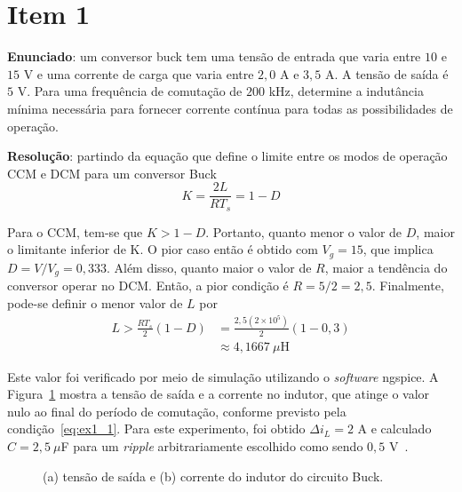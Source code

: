\section*{Item 1}\label{it:1}

\textbf{Enunciado}: um conversor buck tem uma tensão de entrada que varia entre $10$ e $15$ V e uma corrente de carga que varia entre $2{,}0$ A e $3{,}5$ A. A tensão de saída é $5$ V. Para uma frequência de comutação de $200$ kHz, determine a indutância mínima necessária para fornecer corrente contínua para todas as possibilidades de operação.

\medskip
\textbf{Resolução}: partindo da equação que define o limite entre os modos de operação CCM e DCM para um conversor Buck \cite{Eri:20}
\begin{equation}
    K = \frac{2L}{RT_s} = 1 - D
\end{equation}

Para o CCM, tem-se que $K > 1-D$. Portanto, quanto menor o valor de $D$, maior o limitante inferior de K. O pior caso então é obtido com $V_g = 15$, que implica $D = V/V_g = 0{,}333$. Além disso, quanto maior o valor de $R$, maior a tendência do conversor operar no DCM. Então, a pior condição é $R = 5/2 = 2{,}5$. Finalmente, pode-se definir o menor valor de $L$ por
\begin{equation}\label{eq:ex1_1}
\begin{aligned}
    L > \frac{RT_s}{2}(1-D) &= \frac{2{,}5(2\times10^5)}{2}(1-0{,}3) \\
    &\approx 4{,}1667 \ \mu\mathrm{H}
\end{aligned}
\end{equation}

Este valor foi verificado por meio de simulação utilizando o \textit{software} ngspice. A Figura~\ref{fig:ex1} mostra a tensão de saída e a corrente no indutor, que atinge o valor nulo ao final do período de comutação, conforme previsto pela condição~\eqref{eq:ex1_1}. Para este experimento, foi obtido $\Delta i_L = 2$ A e calculado $C = 2{,}5 \ \mu$F para um \textit{ripple} arbitrariamente escolhido como sendo $0{,}5$ V~\cite{cods}.
\begin{figure}[htb!]
    \centering
    
    \caption{(a) tensão de saída e (b) corrente do indutor do circuito Buck.}
    \label{fig:ex1}
\end{figure}